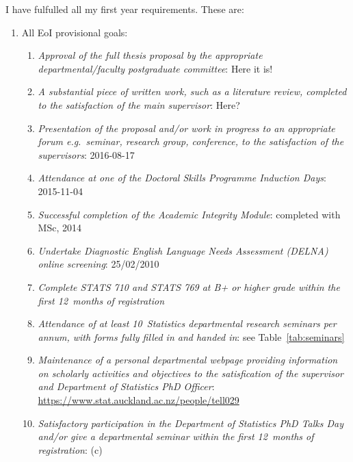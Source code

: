 \documentclass[12pt,a4paper]{article}
\begin{document}
I have fulfulled all my first year requirements.
These are:
\begin{enumerate}

\item
All EoI provisional goals:
\begin{enumerate}

\item
\textit{Approval of the full thesis proposal by the appropriate departmental/faculty postgraduate
committee}:
Here it is!

\item
\textit{A substantial piece of written work, such as a literature review, completed to the
satisfaction of the main supervisor}: Here?


\item
\textit{Presentation of the proposal and/or work in progress to an appropriate forum e.g.\ seminar,
research group, conference, to the satisfaction of the supervisors}:
2016-08-17

\item
\textit{Attendance at one of the Doctoral Skills Programme
Induction Days}:
2015-11-04

\item
\textit{Successful completion of the Academic Integrity Module}:
completed with MSc, 2014

\item
\textit{Undertake Diagnostic English Language Needs Assessment (DELNA) online screening}:
25/02/2010

\item
\textit{Complete STATS 710 and STATS 769 at B+ or higher grade within the first
12~months of registration}

\item
\textit{Attendance of at least 10~Statistics departmental research seminars per annum,
with forms fully filled in and handed in}:
see Table~\ref{tab:seminars}

\item
\textit{Maintenance of a personal departmental webpage providing information on scholarly
activities and objectives to the satisfication of the supervisor and Department of Statistics
PhD Officer}:
\url{https://www.stat.auckland.ac.nz/people/tell029}

\item
\textit{Satisfactory participation in the Department of Statistics PhD Talks Day and/or give
a departmental seminar within the first 12~months of registration}:
(c)



\end{enumerate}
\end{enumerate}
\end{document}
